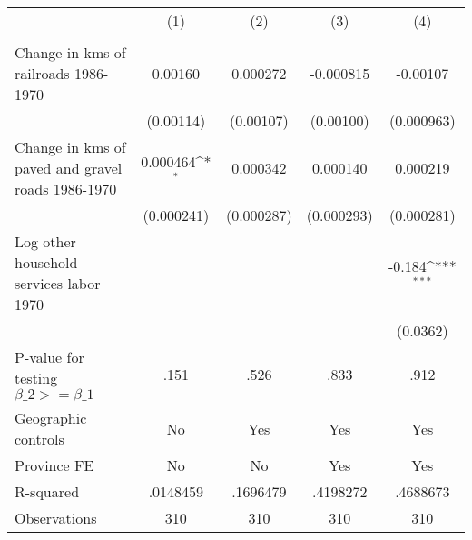 {
\def\sym#1{\ifmmode^{#1}\else\(^{#1}\)\fi}
\begin{tabular}{l*{4}{c}}
\hline\hline
                &\multicolumn{1}{c}{(1)}&\multicolumn{1}{c}{(2)}&\multicolumn{1}{c}{(3)}&\multicolumn{1}{c}{(4)}\\
                &\multicolumn{1}{c}{}&\multicolumn{1}{c}{}&\multicolumn{1}{c}{}&\multicolumn{1}{c}{}\\
\hline
Change in kms of railroads 1986-1970&  0.00160         & 0.000272         &-0.000815         & -0.00107         \\
                &(0.00114)         &(0.00107)         &(0.00100)         &(0.000963)         \\
[1em]
Change in kms of paved and gravel roads 1986-1970& 0.000464\sym{*}  & 0.000342         & 0.000140         & 0.000219         \\
                &(0.000241)         &(0.000287)         &(0.000293)         &(0.000281)         \\
[1em]
Log other household services labor 1970&                  &                  &                  &   -0.184\sym{***}\\
                &                  &                  &                  & (0.0362)         \\
\hline
P-value for testing $\beta\_{2} >= \beta\_{1}$&     .151         &     .526         &     .833         &     .912         \\
Geographic controls&       No         &      Yes         &      Yes         &      Yes         \\
Province FE     &       No         &       No         &      Yes         &      Yes         \\
R-squared       & .0148459         & .1696479         & .4198272         & .4688673         \\
Observations    &      310         &      310         &      310         &      310         \\
\hline\hline
\end{tabular}
}
